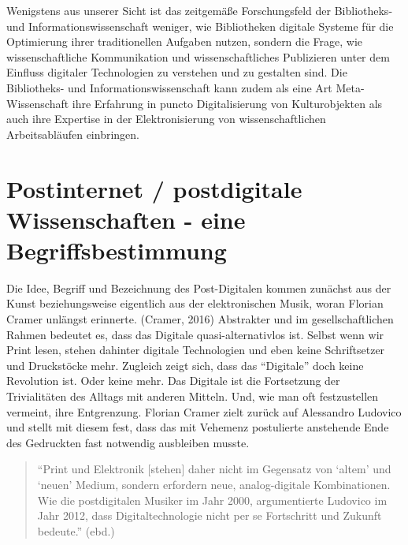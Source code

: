 \documentclass[a4paper,
fontsize=11pt,
oneside,
numbers=noperiodatend,
parskip=half-,
bibliography=totoc,
final
]{scrartcl}
\begin{document}
Wenigstens aus unserer Sicht ist das zeitgemäße Forschungsfeld der
Bibliotheks- und Informationswissenschaft weniger, wie Bibliotheken
digitale Systeme für die Optimierung ihrer traditionellen Aufgaben
nutzen, sondern die Frage, wie wissenschaftliche Kommunikation und
wissenschaftliches Publizieren unter dem Einfluss digitaler Technologien
zu verstehen und zu gestalten sind. Die Bibliotheks- und
Informationswissenschaft kann zudem als eine Art Meta-Wissenschaft ihre
Erfahrung in puncto Digitalisierung von Kulturobjekten als auch ihre
Expertise in der Elektronisierung von wissenschaftlichen Arbeitsabläufen
einbringen.

\section*{Postinternet / postdigitale Wissenschaften - eine
Begriffsbestimmung}\label{postinternet-postdigitale-wissenschaften---eine-begriffsbestimmung}

Die Idee, Begriff und Bezeichnung des Post-Digitalen kommen zunächst aus
der Kunst beziehungsweise eigentlich aus der elektronischen Musik, woran
Florian Cramer unlängst erinnerte. (Cramer, 2016) Abstrakter und im
gesellschaftlichen Rahmen bedeutet es, dass das Digitale
quasi-alternativlos ist. Selbst wenn wir Print lesen, stehen dahinter
digitale Technologien und eben keine Schriftsetzer und Druckstöcke mehr.
Zugleich zeigt sich, dass das \enquote{Digitale} doch keine Revolution
ist. Oder keine mehr. Das Digitale ist die Fortsetzung der Trivialitäten
des Alltags mit anderen Mitteln. Und, wie man oft festzustellen
vermeint, ihre Entgrenzung. Florian Cramer zielt zurück auf Alessandro
Ludovico und stellt mit diesem fest, dass das mit Vehemenz postulierte
anstehende Ende des Gedruckten fast notwendig ausbleiben musste.

\begin{quote}
\enquote{Print und Elektronik {[}stehen{]} daher nicht im Gegensatz von
\enquote{altem} und \enquote{neuen} Medium, sondern erfordern neue,
analog-digitale Kombinationen. Wie die postdigitalen Musiker im Jahr
2000, argumentierte Ludovico im Jahr 2012, dass Digitaltechnologie nicht
per se Fortschritt und Zukunft bedeute.} (ebd.)
\end{quote}
\end{document}
